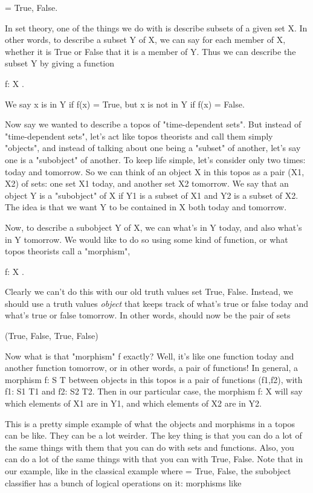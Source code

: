 \Omega  = {True, False}.  

In set theory, one of the things we do with \Omega  is describe subsets of
a given set X.  In other words, to describe a subset Y of X, we can say
for each member of X, whether it is True or False that it is a member of
Y.  Thus we can describe the subset Y by giving a function

f: X \to  \Omega .

We say x is in Y if f(x) = True, but x is not in Y if f(x) = False.  

Now say we wanted to describe a topos of "time-dependent sets".
But instead of "time-dependent sets", let's act like topos theorists and
call them simply "objects", and instead of talking about one being a
"subset" of another, let's say one is a "subobject" of another.  To keep
life simple, let's consider only two times: today and tomorrow.  So we
can think of an object X in this topos as a pair (X1, X2) of sets:
one set X1 today, and another set X2 tomorrow.  We say that an object Y
is a "subobject" of X if Y1 is a subset of X1 and Y2 is a subset of X2.
The idea is that we want Y to be contained in X both today and tomorrow.

Now, to describe a subobject Y of X, we can what's in Y today, and also
what's in Y tomorrow.  We would like to do so using some kind of
function, or what topos theorists call a "morphism",

f: X \to  \Omega .

Clearly we can't do this with our old truth values set {True, False}.
Instead, we should use a truth values \emph{object} \Omega  that keeps track of
what's true or false today and what's true or false tomorrow.  In other
words, \Omega  should now be the pair of sets

({True, False}, {True, False})

Now what is that "morphism" f exactly?  Well, it's like one function today
and another function tomorrow, or in other words, a pair of functions!
In general, a morphism f: S \to  T between objects in this topos is a pair
of functions (f1,f2), with f1: S1 \to  T1 and f2: S2 \to  T2.  Then in our
particular case, the morphism f: X \to  \Omega  will say which elements of 
X1 are in Y1, and which elements of X2 are in Y2.  

This is a pretty simple example of what the objects and morphisms in a
topos can be like.  They can be a lot weirder.  The key thing is that
you can do a lot of the same things with them that you can do with sets
and functions.  Also, you can do a lot of the same things with \Omega 
that you can with {True, False}.   Note that in our example, like in the
classical example where \Omega  = {True, False}, the subobject classifier
has a bunch of logical operations on it: morphisms like

